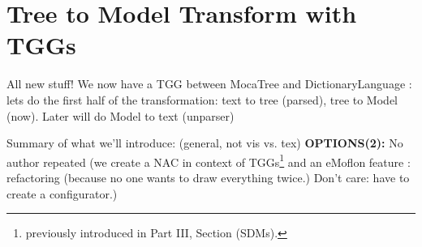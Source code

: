 \newpage
\section{Tree to Model Transform with TGGs}
\genHeader

All new stuff! We now have a TGG between MocaTree and DictionaryLanguage : lets do the first half of the transformation: text to tree (parsed), tree to Model
(now). Later will do Model to text (unparser) 

Summary of what we'll introduce: (general, not vis vs. tex)
{\bf OPTIONS(2):} No author repeated (we create a NAC in context of TGGs\footnote{previously introduced in Part
III, Section (SDMs).} and an eMoflon feature :
refactoring (because no one wants to draw everything twice.) Don't care: have to create a configurator.)








